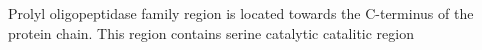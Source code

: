 Prolyl oligopeptidase family region is located towards the C-terminus of the protein chain. This region contains serine catalytic catalitic region 
